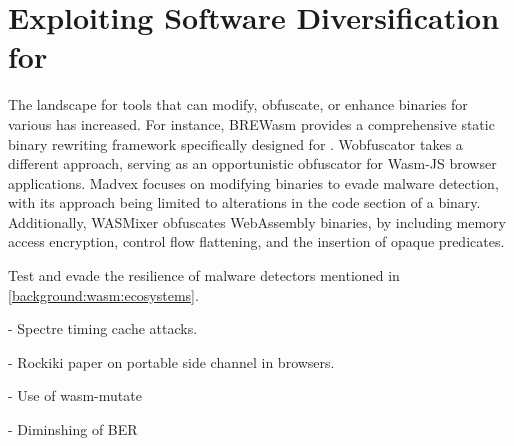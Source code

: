 \chapter{Exploiting Software Diversification for \Wasm}
\label{method}


 The landscape for tools that can modify, obfuscate, or enhance \Wasm binaries for various has increased. 
For instance, BREWasm\cite{BREWasm} provides a comprehensive static binary rewriting framework specifically designed for \Wasm. 
Wobfuscator\cite{wobfuscator} takes a different approach, serving as an opportunistic obfuscator for Wasm-JS browser applications. 
Madvex\cite{madvex} focuses on modifying \Wasm binaries to evade malware detection, with its approach being limited to alterations in the code section of a \Wasm binary. 
Additionally, WASMixer\cite{wasmixer} obfuscates WebAssembly binaries, by including memory access encryption, control flow flattening, and the insertion of opaque predicates.




Test and evade the resilience of \Wasm malware detectors mentioned in \autoref{background:wasm:ecosystems}.










- Spectre timing cache attacks.

- Rockiki paper on portable side channel in browsers.



- Use of wasm-mutate


- Diminshing of BER